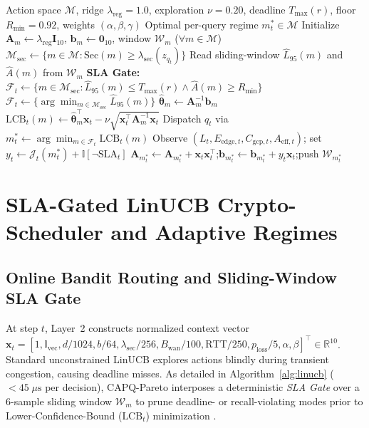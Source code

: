 \documentclass[10pt,journal,compsoc]{IEEEtran}
\begin{document}
\begin{algorithm}[!htbp]
\caption{SLA-Gated Regularized LinUCB Orchestrator}
\label{alg:linucb}
\footnotesize
\begin{algorithmic}[1]
\Require Action space $\mathcal{M}$, ridge $\lambda_{\text{reg}}=1.0$, exploration $\nu=0.20$, deadline $T_{\max}(r)$, floor $R_{\min}=0.92$, weights $(\alpha,\beta,\gamma)$
\Ensure Optimal per-query regime $m_t^* \in \mathcal{M}$
\State Initialize $\mathbf{A}_m \leftarrow \lambda_{\text{reg}}\mathbf{I}_{10}$, $\mathbf{b}_m \leftarrow \mathbf{0}_{10}$, window $\mathcal{W}_m$ ($\forall m \in \mathcal{M}$)
    \State $\mathcal{M}_{\text{sec}} \leftarrow \{m \in \mathcal{M} : \text{Sec}(m) \ge \lambda_{\text{sec}}(z_{q_t})\}$
    \State Read sliding-window $\hat{L}_{95}(m)$ and $\hat{A}(m)$ from $\mathcal{W}_m$
    \State \textbf{SLA Gate:} $\mathcal{F}_t \leftarrow \{m \in \mathcal{M}_{\text{sec}} : \hat{L}_{95}(m) \le T_{\max}(r) \wedge \hat{A}(m) \ge R_{\min}\}$
        \State $\mathcal{F}_t \leftarrow \{\arg\min_{m \in \mathcal{M}_{\text{sec}}} \hat{L}_{95}(m)\}$
    \EndIf
        \State $\hat{\boldsymbol{\theta}}_m \leftarrow \mathbf{A}_m^{-1}\mathbf{b}_m$
        \State $\text{LCB}_t(m) \leftarrow \hat{\boldsymbol{\theta}}_m^\top \mathbf{x}_t - \nu\sqrt{\mathbf{x}_t^\top \mathbf{A}_m^{-1}\mathbf{x}_t}$
    \EndFor
    \State Dispatch $q_t$ via $m_t^* \leftarrow \arg\min_{m \in \mathcal{F}_t} \text{LCB}_t(m)$
    \State Observe $(L_t, E_{\text{edge},t}, C_{\text{gcp},t}, A_{\text{eff},t})$; set $y_t \leftarrow \mathcal{J}_t(m_t^*) + \mathbb{I}[\neg\text{SLA}_t]$
    \State $\mathbf{A}_{m_t^*} \leftarrow \mathbf{A}_{m_t^*} + \mathbf{x}_t\mathbf{x}_t^\top$;\quad $\mathbf{b}_{m_t^*} \leftarrow \mathbf{b}_{m_t^*} + y_t\mathbf{x}_t$;\quad push $\mathcal{W}_{m_t^*}$
\EndFor
\end{algorithmic}
\end{algorithm}

\section{SLA-Gated LinUCB Crypto-Scheduler and Adaptive Regimes}\label{sec:scheduler}
\subsection{Online Bandit Routing and Sliding-Window SLA Gate}
At step $t$, Layer~2 constructs normalized context vector $\mathbf{x}_t = [1, \mathbb{I}_{\text{vec}}, d/1024, b/64, \lambda_{\text{sec}}/256, B_{\text{wan}}/100, \text{RTT}/250, p_{\text{loss}}/5, \alpha, \beta]^\top \in \mathbb{R}^{10}$. Standard unconstrained LinUCB \cite{li2010linucb} explores actions blindly during transient congestion, causing deadline misses. As detailed in Algorithm~\ref{alg:linucb} ($< 45\;\mu\text{s}$ per decision), CAPQ-Pareto interposes a deterministic \emph{SLA Gate} over a $6$-sample sliding window $\mathcal{W}_m$ to prune deadline- or recall-violating modes prior to Lower-Confidence-Bound ($\text{LCB}_t$) minimization \cite{abbasi2011improved_bandits}.
\end{document}
